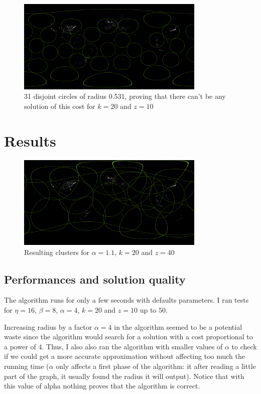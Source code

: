 \documentclass{article}
\begin{document}
  \begin{figure}[h]
    \centering
    \includegraphics[width=0.8\textwidth]{counter_expl_20-10}
    \caption{31 disjoint circles of radius 0.531, proving that there can't be
      any solution of this cost for $k = 20$ and $z = 10$}
  \end{figure}


\section{Results}

  \begin{figure}[h]
    \centering
    \includegraphics[width=0.8\textwidth]{streaming_20-40}
    \caption{Resulting clusters for $\alpha = 1.1$, $k = 20$ and $z = 40$}
  \end{figure}

  \subsection{Performances and solution quality}

    The algorithm runs for only a few seconds with defaults parameters. I ran
    tests for $\eta = 16$, $\beta = 8$, $\alpha = 4$, $k = 20$ and $z = 10$ up
    to $50$.

    Increasing radius by a factor $\alpha = 4$ in the algorithm seemed to be a
    potential waste since the algorithm would search for a solution with a cost
    proportional to a power of $4$. Thus, I also also ran the algorithm with
    smaller values of $\alpha$ to check if we could get a more accurate
    approximation without affecting too much the running time ($\alpha$ only
    affects a first phase of the algorithm: it after reading a little part of
    the graph, it usually found the radius it will output). Notice that with
    this value of alpha nothing proves that the algorithm is correct.
\end{document}
